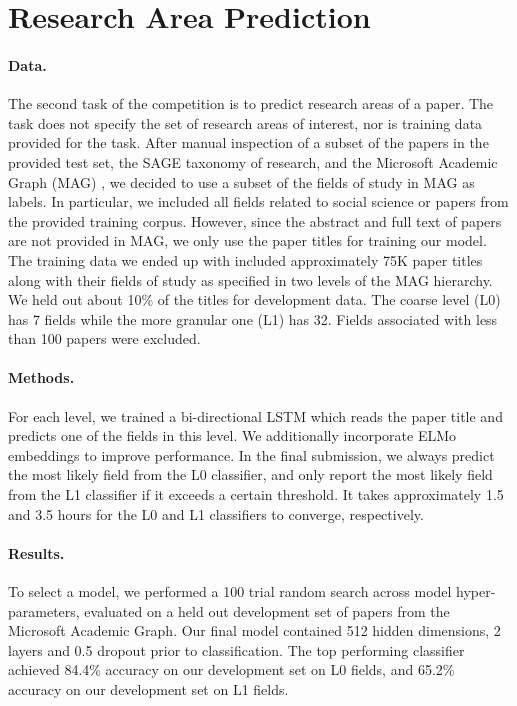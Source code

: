 \documentclass[11pt]{article}
\begin{document}
\section{Research Area Prediction}
\label{sec:areas}

\paragraph{Data.}
The second task of the competition is to predict research areas of a paper. 
The task does not specify the set of research areas of interest, nor is training data provided for the task.
After manual inspection of a subset of the papers in the provided test set, the SAGE taxonomy of research, and the Microsoft Academic Graph (MAG) \cite{Shen2018AWS}, we decided to use a subset of the fields of study in MAG as labels.
In particular, we included all fields related to social science or papers from the provided training corpus.
However, since the abstract and full text of papers are not provided in MAG, we only use the paper titles for training our model.
The training data we ended up with included approximately 75K paper titles along with their fields of study as specified in two levels of the MAG hierarchy. We held out about 10\% of the titles for development data. The coarse level (L0) has 7 fields while the more granular one (L1) has 32. 
Fields associated with less than 100 papers were excluded.

\paragraph{Methods.}
For each level, we trained a bi-directional LSTM which reads the paper title and predicts one of the fields in this level.
We additionally incorporate ELMo embeddings \cite{Peters2018DEEPCW} to improve performance. In the final submission, we always predict the most likely field from the L0 classifier, and only report the most likely field from the L1 classifier if it exceeds a certain threshold. It takes approximately 1.5 and 3.5 hours for the L0 and L1 classifiers to converge, respectively.

\paragraph{Results.}

To select a model, we performed a 100 trial random search across model hyper-parameters, evaluated on a held out development set of papers from the Microsoft Academic Graph. Our final model contained 512 hidden dimensions, 2 layers and 0.5 dropout prior to classification. The top performing classifier achieved 84.4\% accuracy on our development set on L0 fields, and 65.2\% accuracy on our development set on L1 fields. 
 
\end{document}
